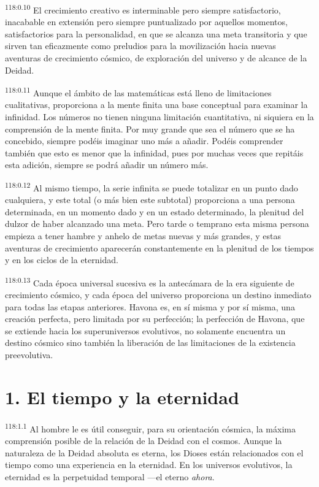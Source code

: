 \documentclass[twoside, 11pt]{book}
\begin{document}
\par
\textsuperscript{118:0.10} El crecimiento creativo es interminable pero siempre satisfactorio, inacabable en extensión pero siempre puntualizado por aquellos momentos, satisfactorios para la personalidad, en que se alcanza una meta transitoria y que sirven tan eficazmente como preludios para la movilización hacia nuevas aventuras de crecimiento cósmico, de exploración del universo y de alcance de la Deidad.

\par
\textsuperscript{118:0.11} Aunque el ámbito de las matemáticas está lleno de limitaciones cualitativas, proporciona a la mente finita una base conceptual para examinar la infinidad. Los números no tienen ninguna limitación cuantitativa, ni siquiera en la comprensión de la mente finita. Por muy grande que sea el número que se ha concebido, siempre podéis imaginar uno más a añadir. Podéis comprender también que esto es menor que la infinidad, pues por muchas veces que repitáis esta adición, siempre se podrá añadir un número más.

\par
\textsuperscript{118:0.12} Al mismo tiempo, la serie infinita se puede totalizar en un punto dado cualquiera, y este total (o más bien este subtotal) proporciona a una persona determinada, en un momento dado y en un estado determinado, la plenitud del dulzor de haber alcanzado una meta. Pero tarde o temprano esta misma persona empieza a tener hambre y anhelo de metas nuevas y más grandes, y estas aventuras de crecimiento aparecerán constantemente en la plenitud de los tiempos y en los ciclos de la eternidad.

\par
\textsuperscript{118:0.13} Cada época universal sucesiva es la antecámara de la era siguiente de crecimiento cósmico, y cada época del universo proporciona un destino inmediato para todas las etapas anteriores. Havona es, en sí misma y por sí misma, una creación perfecta, pero limitada por su perfección; la perfección de Havona, que se extiende hacia los superuniversos evolutivos, no solamente encuentra un destino cósmico sino también la liberación de las limitaciones de la existencia preevolutiva.

\section*{1. El tiempo y la eternidad}
\par
\textsuperscript{118:1.1} Al hombre le es útil conseguir, para su orientación cósmica, la máxima comprensión posible de la relación de la Deidad con el cosmos. Aunque la naturaleza de la Deidad absoluta es eterna, los Dioses están relacionados con el tiempo como una experiencia en la eternidad. En los universos evolutivos, la eternidad es la perpetuidad temporal ---el eterno \textit{ahora}.
\end{document}
